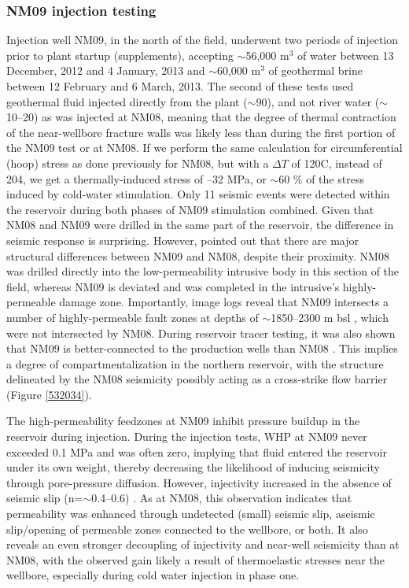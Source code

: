 \subsubsection{NM09 injection testing}
Injection well NM09, in the north of the field, underwent two periods of injection prior to plant startup (supplements), accepting $\sim$56,000 m$^3$ of water between 13 December, 2012 and 4 January, 2013 and $\sim$60,000 m$^3$ of geothermal brine between 12 February and 6 March, 2013. The second of these tests used geothermal fluid injected directly from the plant ($\sim$90), and not river water ($\sim$10--20) as was injected at NM08, meaning that the degree of thermal contraction of the near-wellbore fracture walls was likely less than during the first portion of the NM09 test or at NM08. If we perform the same calculation for circumferential (hoop) stress as done previously for NM08, but with a $\Delta{T}$ of 120\textdegree C, instead of 204\textdegree, we get a thermally-induced stress of --32 MPa, or $\sim$60 \% of the stress induced by cold-water \gls{stimulation}. Only 11 seismic events were detected within the reservoir during both phases of NM09 stimulation combined. Given that NM08 and NM09 were drilled in the same part of the reservoir, the difference in seismic response is surprising. However, \citet{Clearwater_2015} pointed out that there are major structural differences between NM09 and NM08, despite their proximity. NM08 was drilled directly into the low-permeability intrusive body in this section of the field, whereas NM09 is deviated and was completed in the intrusive's highly-permeable damage zone. Importantly, image logs reveal that NM09 intersects a number of highly-permeable fault zones at depths of $\sim$1850--2300 m bsl \citep{nm09_report}, which were not intersected by NM08. During reservoir tracer testing, it was also shown that NM09 is better-connected to the production wells than NM08 \citep{buscarlet_2015}. This implies a degree of compartmentalization in the northern reservoir, with the structure delineated by the NM08 seismicity possibly acting as a cross-strike flow barrier \citep{buscarlet_2015} (Figure \ref{532034}).

The high-permeability \glspl{feedzone} at NM09 inhibit pressure buildup in the reservoir during injection. During the injection tests, \acrshort{WHP} at NM09 never exceeded 0.1 MPa and was often zero, implying that fluid entered the reservoir under its own weight, thereby decreasing the likelihood of inducing seismicity through pore-pressure diffusion. However, \gls{injectivity} increased in the absence of seismic slip (n=$\sim$0.4--0.6) \citep{Clearwater_2015}. As at NM08, this observation indicates that \gls{permeability} was enhanced through undetected (small) seismic slip, aseismic slip\slash{opening} of permeable zones connected to the wellbore, or both. It also reveals an even stronger decoupling of \gls{injectivity} and near-well seismicity than at NM08, with the observed gain likely a result of thermoelastic stresses near the wellbore, especially during cold water injection in phase one.


